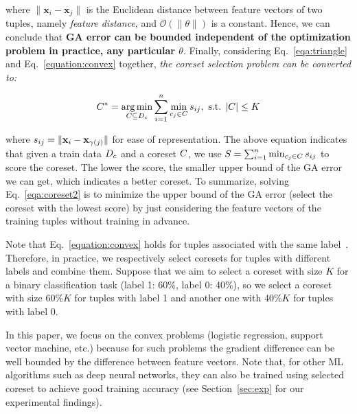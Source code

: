 \noindent where $\lVert \mathbf{x}_i - \mathbf{x}_j \rVert$ is the Euclidean distance between  feature vectors of two tuples, namely \textit{feature distance}, and 
 $\mathcal{O}(\lVert \theta \rVert)$ is a constant. Hence, we can conclude that \textbf{GA error can be bounded independent of the optimization problem in practice, \ie any particular $\theta$}. Finally, considering Eq.~\ref{eqa:triangle} and  Eq.~\ref{equation:convex} together,  \textit{the coreset selection problem can be converted to:}
 
 \vspace{-0.5em}
 \begin{equation}\label{eqa:coreset2}
 \core^* = \argmin\limits_{C\subseteq \trainc}\sum_{i=1}^n \min_{c_j\in C}\dist_{ij}, \text{ s.t. } |C| \le \numcore %
 \end{equation}
 
 \noindent where $s_{ij} = \lVert
 \mathbf{x}_i - \mathbf{x}_{\gamma(j)}  \rVert$ for ease of representation. The above equation indicates that given a train data $D_c$ and a coreset $C$, we use  $S = \sum_{i=1}^n \min_{c_j\in C}s_{ij}$ to score the coreset. The lower the score, the smaller upper bound of the GA error we can get, which indicates a better coreset.
 To summarize, solving Eq.~\ref{eqa:coreset2} is to minimize the upper bound of the GA error (\ie select the coreset with the lowest score) by just considering the feature vectors of the training tuples without  training in advance.
 
Note that Eq.~\ref{equation:convex} holds for tuples associated with the same label~\cite{allen2016exploiting, hofmann2015variance}. Therefore, in practice, we respectively select coresets for tuples with different labels and combine them. Suppose that we aim to select a coreset with size  $K$ for a binary classification task (label 1: 60\%, label 0: 40\%), so we select a coreset with size 60\%$K$ for tuples with label 1 and another one with 40\%$K$ for tuples with label 0.
 
 In this paper, we focus on the convex problems (\eg logistic regression, support vector machine, etc.) because for such
problems the gradient difference can be well bounded by the difference
between feature vectors. 
%
Note that, for other ML algorithms such as deep neural networks, they can also be trained using selected coreset to achieve good training accuracy (see Section~\ref{sec:exp} for our experimental findings).

